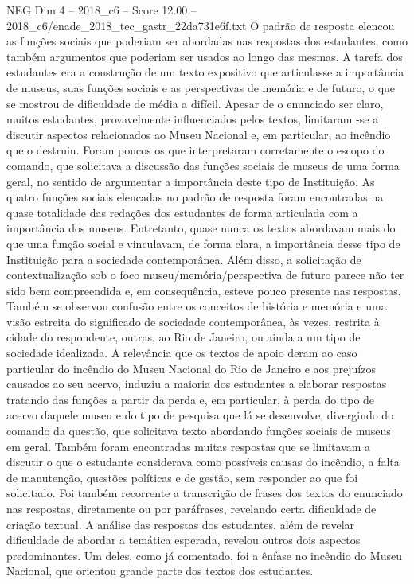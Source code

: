 \begin{textsample}{NEG Dim 4 – 2018\_c6 – Score 12.00 – 2018\_c6/enade\_2018\_tec\_gastr\_22da731e6f.txt}
O padrão de resposta elencou as funções sociais que poderiam ser abordadas nas respostas dos estudantes, como também argumentos que poderiam ser usados ao longo das mesmas.
A tarefa dos estudantes era a construção de um texto expositivo que articulasse a importância de museus, suas funções sociais e as perspectivas de memória e de futuro, o que se mostrou de dificuldade de média a difícil.
Apesar de o enunciado ser claro, muitos estudantes, provavelmente influenciados pelos textos, limitaram -se a discutir aspectos relacionados ao Museu Nacional e, em particular, ao incêndio que o destruiu.
Foram poucos os que interpretaram corretamente o escopo do comando, que solicitava a discussão das funções sociais de museus de uma forma geral, no sentido de argumentar a importância deste tipo de Instituição.
As quatro funções sociais elencadas no padrão de resposta foram encontradas na quase totalidade das redações dos estudantes de forma articulada com a importância dos museus.
Entretanto, quase nunca os textos abordavam mais do que uma função social e vinculavam, de forma clara, a importância desse tipo de Instituição para a sociedade contemporânea.
Além disso, a solicitação de contextualização sob o foco museu/memória/perspectiva de futuro parece não ter sido bem compreendida e, em consequência, esteve pouco presente nas respostas.
Também se observou confusão entre os conceitos de história e memória e uma visão estreita do significado de sociedade contemporânea, às vezes, restrita à cidade do respondente, outras, ao Rio de Janeiro, ou ainda a um tipo de sociedade idealizada.
A relevância que os textos de apoio deram ao caso particular do incêndio do Museu Nacional do Rio de Janeiro e aos prejuízos causados ao seu acervo, induziu a maioria dos estudantes a elaborar respostas tratando das funções a partir da perda e, em particular, à perda do tipo de acervo daquele museu e do tipo de pesquisa que lá se desenvolve, divergindo do comando da questão, que solicitava texto abordando funções sociais de museus em geral.
Também foram encontradas muitas respostas que se limitavam a discutir o que o estudante considerava como possíveis causas do incêndio, a falta de manutenção, questões políticas e de gestão, sem responder ao que foi solicitado.
Foi também recorrente a transcrição de frases dos textos do enunciado nas respostas, diretamente ou por paráfrases, revelando certa dificuldade de criação textual.
A análise das respostas dos estudantes, além de revelar dificuldade de abordar a temática esperada, revelou outros dois aspectos predominantes.
Um deles, como já comentado, foi a ênfase no incêndio do Museu Nacional, que orientou grande parte dos textos dos estudantes.

\end{textsample}
